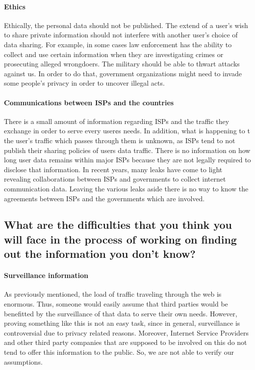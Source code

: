 \paragraph{Ethics}
Ethically, the personal data should not be published. The extend of a user's 
wish to share private information should not interfere with another user's 
choice of data sharing. For example, in some cases law enforcement has the 
ability to collect and use certain information when they are investigating 
crimes or prosecuting alleged wrongdoers. The military  should  be able to 
thwart attacks against us. In order to do that, government organizations might 
need to invade some people's privacy in order to uncover illegal acts. 


\paragraph{Communications between ISPs and the countries}
There is a small amount of information regarding ISPs and the traffic they 
exchange in order to serve every user¢s needs. In addition, what is happening to t
the user's traffic which passes through them is unknown, as ISPs tend to not 
publish their sharing policies of users data traffic. There is no information on 
how long user data remains within major ISPs because they are not legally 
required to disclose that information. In recent years, many leaks have come to 
light revealing collaborations between ISPs and governments to collect internet 
communication data. Leaving the various leaks aside there is no way to know the 
agreements between ISPs and the governments which are involved. 


\subsection{What are the difficulties that you think you will face in the 
process of working on finding out the information you don't know?}

\paragraph{Surveillance information}
As previously mentioned, the load of traffic traveling through the web is 
enormous. Thus, someone would easily assume that third parties would be 
benefitted by the surveillance of that data to serve their own needs. However, 
proving something like this is not an easy task, since in general, surveillance 
is controversial due to privacy related reasons. Moreover, Internet Service 
Providers and other third party companies that are supposed to be involved on 
this do not tend to offer this information to the public. So, we are not able to 
verify our assumptions.  

